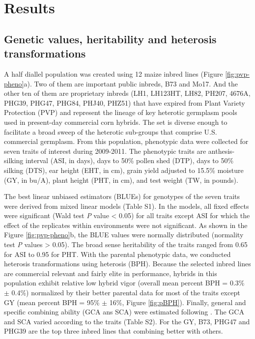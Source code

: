 \documentclass[9pt,twocolumn,twoside]{gsajnl}
\begin{document}
\section*{Results}


\subsection*{Genetic values, heritability and heterosis transformations}

A half diallel population was created using 12 maize inbred lines (Figure \ref{fig:pvp-pheno}a). Two of them are important public inbreds, B73 and Mo17. And the other ten of them are proprietary inbreds (LH1, LH123HT, LH82, PH207, 4676A, PHG39, PHG47, PHG84, PHJ40, PHZ51) that have expired from Plant Variety Protection (PVP) and represent the lineage of key heterotic germplasm pools used in present-day commercial corn hybrids. The set is diverse enough to facilitate a broad sweep of the heterotic sub-groups that comprise U.S. commercial germplasm. From this population, phenotypic data were collected for seven traits of interest during 2009-2011. The phenotypic traits are anthesis-silking interval (ASI, in days), days to 50\% pollen shed (DTP), days to 50\% silking (DTS), ear height (EHT, in cm), grain yield adjusted to 15.5\% moisture (GY, in bu/A), plant height (PHT, in cm), and test weight (TW, in pounds).

The best linear unbiased estimators (BLUEs) for genotypes of the seven traits were derived from mixed linear models (Table S1). In the models, all fixed effects were significant (Wald test \emph{P} value < 0.05) for all traits except ASI for which the effect of the replicates within environments were not significant. As shown in the Figure \ref{fig:pvp-pheno}b, the BLUE values were normally distributed (normality test \emph{P} values > 0.05). The broad sense heritability of the traits ranged from 0.65 for ASI to 0.95 for PHT. With the parental phenotypic data, we conducted heterosis transformations using \DIFdelbegin {}\DIFdelend \DIFaddbegin {}\DIFaddend heterosis (BPH). Because the selected inbred lines are commercial relevant and fairly elite in performance, hybrids in this population exhibit relative low hybrid vigor (overall mean percent BPH = 0.3\% $\pm$ 0.4\%) normalized by their better parental data for most of the traits except GY (mean percent BPH = 95\% $\pm$ 16\%, Figure \ref{fig:pBPH}). Finally, general and specific combining ability (GCA ans SCA) were estimated following \citep{Falconer1996}. The GCA and SCA varied according to the traits (Table S2). For the GY, B73, PHG47 and PHG39 are the top three inbred lines that combining better with others.
\end{document}
